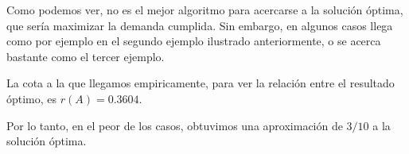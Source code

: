 Como podemos ver, no es el mejor algoritmo para acercarse a la solución óptima, que sería maximizar la demanda cumplida. Sin embargo, en algunos casos llega como por ejemplo en el segundo ejemplo ilustrado anteriormente, o se acerca bastante como el tercer ejemplo. 

La cota a la que llegamos empiricamente, para ver la relación entre el resultado óptimo, es $r(A) = 0.3604$.

Por lo tanto, en el peor de los casos, obtuvimos una aproximación de $3/10$ a la solución óptima.

